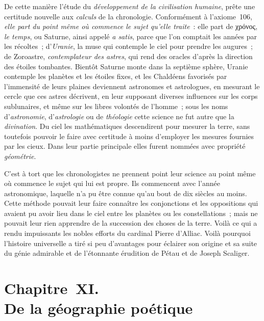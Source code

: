 \documentclass[french,twoside]{book} %
\newcommand\chapteropen{} %
\newcommand\chapterclose{} %
\begin{document}
\par
De cette manière l’étude du {\itshape développement de la civilisation humaine}, prête une certitude nouvelle aux {\itshape calculs} de la chronologie. Conformément à l’axiome 106, {\itshape elle part du point même où commence le sujet qu’elle traite} : elle part de χρόνος, {\itshape le temps}, ou Saturne, ainsi appelé {\itshape a satis}, parce que l’on comptait les années par les récoltes ; d’{\itshape Uranie}, la muse qui contemple le ciel pour prendre les augures ; de Zoroastre, {\itshape contemplateur des astres}, qui rend des oracles d’après la direction des étoiles tombantes. Bientôt Saturne monte dans la septième sphère, Uranie contemple les planètes et les étoiles fixes, et les Chaldéens favorisés par l’immensité  de leurs plaines deviennent astronomes et astrologues, en mesurant le cercle que ces astres décrivent, en leur supposant diverses influences sur les corps sublunaires, et même sur les libres volontés de l’homme ; sous les noms d’{\itshape astronomie}, d’{\itshape astrologie} ou de {\itshape théologie} cette science ne fut autre que la {\itshape divination}. Du ciel les mathématiques descendirent pour mesurer la terre, sans toutefois pouvoir le faire avec certitude à moins d’employer les mesures fournies par les cieux. Dans leur partie principale elles furent nommées avec propriété {\itshape géométrie}.\par
C’est à tort que les chronologistes ne prennent point leur science au point même où commence le sujet qui lui est propre. Ils commencent avec l’année astronomique, laquelle n’a pu être connue qu’au bout de dix siècles au moins. Cette méthode pouvait leur faire connaître les conjonctions et les oppositions qui avaient pu avoir lieu dans le ciel entre les planètes ou les constellations ; mais ne pouvait leur rien apprendre de la succession des choses de la terre. Voilà ce qui a rendu impuissants les nobles efforts du cardinal Pierre d’Alliac. Voilà pourquoi l’histoire universelle a tiré si peu d’avantages pour éclairer son origine et sa suite du génie admirable et de l’étonnante érudition de Pétau et de Joseph Scaliger.
\chapterclose


\chapteropen
\chapter[{Chapitre XI. De la géographie poétique}]{Chapitre XI. \\
De la géographie poétique}
\end{document}
